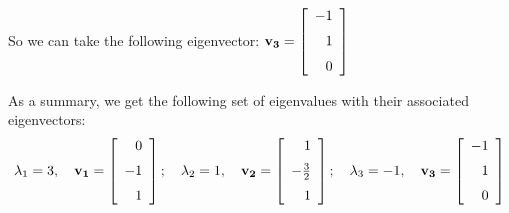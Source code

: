 \documentclass[12pt]{article}
\begin{document}
{So we can take the following eigenvector:
$\displaystyle{
\mathbf{v_3} = 
\left [\begin {array}{r} -1\\\noalign{\medskip}1
\\\noalign{\medskip}0\end {array}\right ]
}$


As a summary, we get the following set of eigenvalues with 
their associated eigenvectors:
\[
\lambda_1 = 3,\quad
\mathbf{v_1} = 
\left [\begin {array}{r} 0\\\noalign{\medskip}-1\\\noalign{\medskip}1
\end {array}\right ]
;
\quad
\lambda_2 = 1,\quad
\mathbf{v_2} = 
\left [\begin {array}{r} 1\\\noalign{\medskip}-\frac{3}{2}
\\\noalign{\medskip}1\end {array}\right ]
;
\quad
\lambda_3 = -1,\quad
\mathbf{v_3} = 
\left [\begin {array}{r} -1\\\noalign{\medskip}1
\\\noalign{\medskip}0\end {array}\right ]
\]



}
\clearpage


\end{document}
